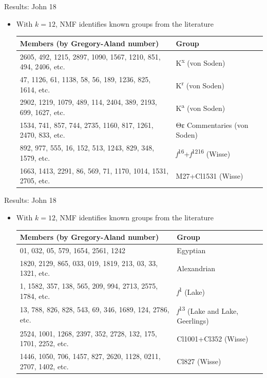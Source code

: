 \documentclass[10pt]{beamer}
\begin{document}
	\begin{frame}{Results: John 18}
		\begin{itemize}
			\item With $k = 12$, NMF identifies known groups from the literature
			\begin{center}
				\matrixfont
				\footnotesize
				\begin{tabular}{p{2.5in}p{0.75in}}
					Members (by Gregory-Aland number) & Group\\
					\hline
					2605, 492, 1215, 2897, 1090, 1567, 1210, 851, 494, 2406, etc. & Κ\textsuperscript{x} (von Soden)\\
					\hline
					47, 1126, 61, 1138, 58, 56, 189, 1236, 825, 1614, etc. & Κ\textsuperscript{r} (von Soden)\\
					\hline
					2902, 1219, 1079, 489, 114, 2404, 389, 2193, 699, 1627, etc. & Κ\textsuperscript{a} (von Soden)\\
					\hline
					1534, 741, 857, 744, 2735, 1160, 817, 1261, 2470, 833, etc. & Θε Commentaries (von Soden)\\
					\hline
					892, 977, 555, 16, 152, 513, 1243, 829, 348, 1579, etc. & \emph{f}\textsuperscript{16}+\emph{f}\textsuperscript{1216} (Wisse)\\
					\hline
					1663, 1413, 2291, 86, 569, 71, 1170, 1014, 1531, 2705, etc. & M27+Cl1531 (Wisse)
				\end{tabular}
			\end{center}
		\end{itemize}
	\end{frame}
	\begin{frame}{Results: John 18}
		\begin{itemize}
			\item With $k = 12$, NMF identifies known groups from the literature
			\begin{center}
				\matrixfont
				\footnotesize
				\begin{tabular}{p{2.5in}p{1.25in}}
					Members (by Gregory-Aland number) & Group\\
					\hline
					01, 032, 05, 579, 1654, 2561, 1242 & Egyptian\\
					\hline
					1820, 2129, 865, 033, 019, 1819, 213, 03, 33, 1321, etc. & Alexandrian\\
					\hline
					1, 1582, 357, 138, 565, 209, 994, 2713, 2575, 1784, etc. & \emph{f}\textsuperscript{1} (Lake)\\
					\hline
					13, 788, 826, 828, 543, 69, 346, 1689, 124, 2786, etc. & \emph{f}\textsuperscript{13} (Lake and Lake, Geerlings)\\
					\hline
					2524, 1001, 1268, 2397, 352, 2728, 132, 175, 1701, 2252, etc. & Cl1001+Cl352 (Wisse)\\
					\hline
					1446, 1050, 706, 1457, 827, 2620, 1128, 0211, 2707, 1402, etc. & Cl827 (Wisse)
				\end{tabular}
			\end{center}
		\end{itemize}
	\end{frame}
\end{document}
